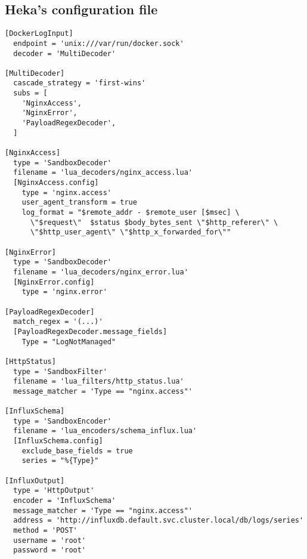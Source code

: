\subsection{Heka's configuration file}\label{hekas-configuration-file}

\begin{verbatim}
[DockerLogInput]
  endpoint = 'unix:///var/run/docker.sock'
  decoder = 'MultiDecoder'

[MultiDecoder]
  cascade_strategy = 'first-wins'
  subs = [
    'NginxAccess',
    'NginxError',
    'PayloadRegexDecoder',
  ]

[NginxAccess]
  type = 'SandboxDecoder'
  filename = 'lua_decoders/nginx_access.lua'
  [NginxAccess.config]
    type = 'nginx.access'
    user_agent_transform = true
    log_format = "$remote_addr - $remote_user [$msec] \
      \"$request\"  $status $body_bytes_sent \"$http_referer\" \
      \"$http_user_agent\" \"$http_x_forwarded_for\""

[NginxError]
  type = 'SandboxDecoder'
  filename = 'lua_decoders/nginx_error.lua'
  [NginxError.config]
    type = 'nginx.error'

[PayloadRegexDecoder]
  match_regex = '(...)'
  [PayloadRegexDecoder.message_fields]
    Type = "LogNotManaged"

[HttpStatus]
  type = 'SandboxFilter'
  filename = 'lua_filters/http_status.lua'
  message_matcher = 'Type == "nginx.access"'

[InfluxSchema]
  type = 'SandboxEncoder'
  filename = 'lua_encoders/schema_influx.lua'
  [InfluxSchema.config]
    exclude_base_fields = true
    series = "%{Type}"

[InfluxOutput]
  type = 'HttpOutput'
  encoder = 'InfluxSchema'
  message_matcher = 'Type == "nginx.access"'
  address = 'http://influxdb.default.svc.cluster.local/db/logs/series'
  method = 'POST'
  username = 'root'
  password = 'root'
\end{verbatim}